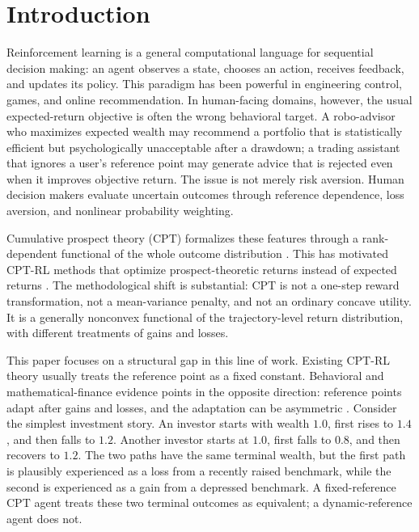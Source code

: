 \documentclass[11pt]{article}
\newcommand{\1}{\mathbf 1}
\newcommand{\CPT}{\ensuremath{\mathrm{CPT}}\xspace}
\begin{document}
\section{Introduction}\label{sec:introduction}

Reinforcement learning is a general computational language for sequential decision making: an agent observes a state, chooses an action, receives feedback, and updates its policy.  This paradigm has been powerful in engineering control, games, and online recommendation.  In human-facing domains, however, the usual expected-return objective is often the wrong behavioral target.  A robo-advisor who maximizes expected wealth may recommend a portfolio that is statistically efficient but psychologically unacceptable after a drawdown; a trading assistant that ignores a user's reference point may generate advice that is rejected even when it improves objective return.  The issue is not merely risk aversion.  Human decision makers evaluate uncertain outcomes through reference dependence, loss aversion, and nonlinear probability weighting.

Cumulative prospect theory (\CPT) formalizes these features through a rank-dependent functional of the whole outcome distribution \citep{kahneman1979prospect,tversky1992advances}.  This has motivated \CPT-RL methods that optimize prospect-theoretic returns instead of expected returns \citep{prashanth2016cumulative,jie2018stochastic,ramasubramanian2021reinforcement,lepel2024policygradients}.  The methodological shift is substantial: \CPT is not a one-step reward transformation, not a mean-variance penalty, and not an ordinary concave utility.  It is a generally nonconvex functional of the trajectory-level return distribution, with different treatments of gains and losses.

This paper focuses on a structural gap in this line of work.  Existing \CPT-RL theory usually treats the reference point as a fixed constant.  Behavioral and mathematical-finance evidence points in the opposite direction: reference points adapt after gains and losses, and the adaptation can be asymmetric \citep{arkes2008reference,arkes2010cross,he2019realization,qin2022realization}.  Consider the simplest investment story.  An investor starts with wealth $1.0$, first rises to $1.4$, and then falls to $1.2$.  Another investor starts at $1.0$, first falls to $0.8$, and then recovers to $1.2$.  The two paths have the same terminal wealth, but the first path is plausibly experienced as a loss from a recently raised benchmark, while the second is experienced as a gain from a depressed benchmark.  A fixed-reference \CPT agent treats these two terminal outcomes as equivalent; a dynamic-reference agent does not.
\end{document}
